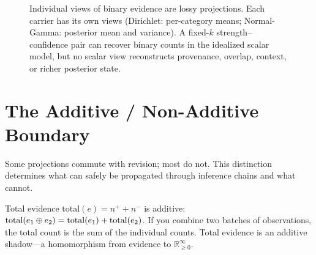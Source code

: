 \documentclass[11pt,openany]{report}
\begin{document}
\begin{figure}[htbp]
\centering
{}
\caption{Individual views of binary evidence are lossy projections.  Each carrier
has its own views (Dirichlet: per-category means; Normal-Gamma:
posterior mean and variance).  A fixed-$k$ strength--confidence pair
can recover binary counts in the idealized scalar model, but no scalar
view reconstructs provenance, overlap, context, or richer posterior
state.}
\label{fig:tv-views-projections}
\end{figure}


\section{The Additive / Non-Additive Boundary}

Some projections commute with revision; most do not.  This
distinction determines what can safely be propagated through
inference chains and what cannot.

Total evidence $\mathrm{total}(e) = n^+ + n^-$ is additive:
$\mathrm{total}(e_1 \oplus e_2) = \mathrm{total}(e_1) +
\mathrm{total}(e_2)$.  If you combine two batches of observations,
the total count is the sum of the individual counts.  Total evidence
is an additive shadow---a homomorphism from evidence to
$\mathbb{R}_{\ge 0}^\infty$.
\end{document}
